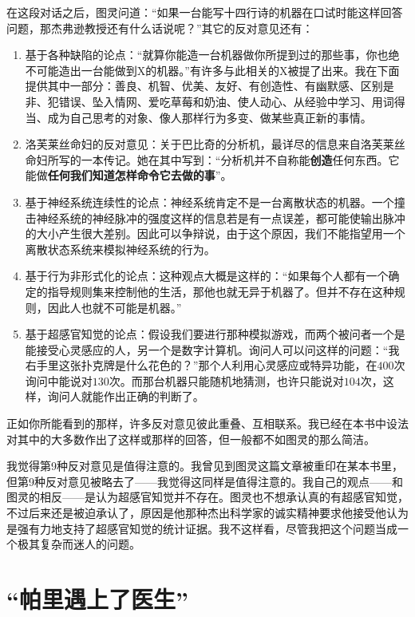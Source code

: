 在这段对话之后，图灵问道：“如果一台能写十四行诗的机器在口试时能这样回答问题，那杰弗逊教授还有什么话说呢？”其它的反对意见还有：
\begin{enumerate}[resume]
\item 基于各种缺陷的论点：“就算你能造一台机器做你所提到过的那些事，你也绝不可能造出一台能做到X的机器。”有许多与此相关的X被提了出来。我在下面提供其中一部分：善良、机智、优美、友好、有创造性、有幽默感、区别是非、犯错误、坠入情网、爱吃草莓和奶油、使人动心、从经验中学习、用词得当、成为自己思考的对象、像人那样行为多变、做某些真正新的事情。
\item 洛芙莱丝命妇的反对意见：关于巴比奇的分析机，最详尽的信息来自洛芙莱丝命妇所写的一本传记。她在其中写到：“分析机并不自称能\textsf{\bfseries 创造}任何东西。它能做\textsf{\bfseries 任何我们知道怎样命令它去做的事}”。
\item 基于神经系统连续性的论点：神经系统肯定不是一台离散状态的机器。一个撞击神经系统的神经脉冲的强度这样的信息若是有一点误差，都可能使输出脉冲的大小产生很大差别。因此可以争辩说，由于这个原因，我们不能指望用一个离散状态系统来模拟神经系统的行为。
\item 基于行为非形式化的论点：这种观点大概是这样的：“如果每个人都有一个确定的指导规则集来控制他的生活，那他也就无异于机器了。但并不存在这种规则，因此人也就不可能是机器。”
\item 基于超感官知觉的论点：假设我们要进行那种模拟游戏，而两个被问者一个是能接受心灵感应的人，另一个是数字计算机。询问人可以问这样的问题：“我右手里这张扑克牌是什么花色的？”那个人利用心灵感应或特异功能，在$400$次询问中能说对$130$次。而那台机器只能随机地猜测，也许只能说对$104$次，这样，询问人就能作出正确的判断了。
\end{enumerate}

正如你所能看到的那样，许多反对意见彼此重叠、互相联系。我已经在本书中设法对其中的大多数作出了这样或那样的回答，但一般都不如图灵的那么简洁。

我觉得第9种反对意见是值得注意的。我曾见到图灵这篇文章被重印在某本书里，但第9种反对意见被略去了——我觉得这同样是值得注意的。我自己的观点——和图灵的相反——是认为超感官知觉并不存在。图灵也不想承认真的有超感官知觉，不过后来还是被迫承认了，原因是他那种杰出科学家的诚实精神要求他接受他认为是强有力地支持了超感官知觉的统计证据。我不这样看，尽管我把这个问题当成一个极其复杂而迷人的问题。

\section{“帕里遇上了医生”}

